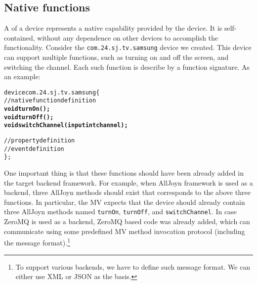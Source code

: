 \documentclass{note}
\begin{document}
\subsection{Native functions}
A  of a device represents a native capability provided 
by the device. It is self-contained, without any dependence on other devices 
to accomplish the functionality.
Consider the \verb+com.24.sj.tv.samsung+ device we created.
This device can support
multiple functions, such as turning on and off the screen, and switching the
channel. Each such function is describe by a function signature. 
As an example:
\begin{alltt}
  device com.24.sj.tv.samsung \{
    // native function definition
    \textbf{void turnOn();
    void turnOff(); 
    void switchChannel(input int channel);}

    // property definition
    // event definition
  \};
\end{alltt}
One important thing is that these functions should have been already added 
in  the target backend framework. For example, when AllJoyn
framework is used as a backend, three AllJoyn methods should exist that
corresponds to the above three functions. In particular, the MV expects
that the device should already contain three AllJoyn methods named
\verb+turnOn+, \verb+turnOff+, and  \verb+switchChannel+.  
In case ZeroMQ is
used as a backend, ZeroMQ based  
code was already added, which can communicate using some predefined MV method
invocation protocol (including the message format).\footnote{To support various
  backends, we have to define such message format. We can either use XML or
  JSON as the basis.}



\end{document}
